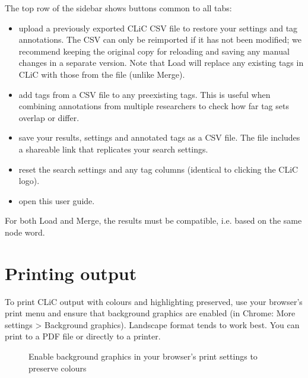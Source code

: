 \documentclass[letterpaper,10pt,english]{sphinxmanual}
\begin{document}
\sphinxAtStartPar
The top row of the sidebar shows buttons common to all tabs:
\begin{itemize}
\item {} 
\sphinxAtStartPar
{} \textendash{} upload a previously exported CLiC CSV file to restore
your settings and tag annotations. The CSV can only be reimported
if it has not been modified; we recommend keeping the original copy
for reloading and saving any manual changes in a separate version.
Note that Load will replace any existing tags in CLiC with those
from the file (unlike Merge).

\item {} 
\sphinxAtStartPar
{} \textendash{} add tags from a CSV file to any pre\sphinxhyphen{}existing tags. This
is useful when combining annotations from multiple researchers to
check how far tag sets overlap or differ.

\item {} 
\sphinxAtStartPar
{} \textendash{} save your results, settings and annotated tags as a CSV
file. The file includes a shareable link that replicates your search
settings.

\item {} 
\sphinxAtStartPar
{} \textendash{} reset the search settings and any tag columns (identical
to clicking the CLiC logo).

\item {} 
\sphinxAtStartPar
{} \textendash{} open this user guide.

\end{itemize}

\sphinxAtStartPar
For both Load and Merge, the results must be compatible, i.e. based on
the same node word.


\section{Printing output}
\label{\detokenize{introduction:printing-output}}
\sphinxAtStartPar
To print CLiC output with colours and highlighting preserved, use your
browser’s print menu and ensure that background graphics are enabled
(in Chrome: More settings \textgreater{} Background graphics). Landscape format
tends to work best. You can print to a PDF file or directly to a
printer.

\begin{figure}[htbp]
\centering
\capstart

\noindent{}
\caption{Enable background graphics in your browser’s print settings
to preserve colours}\label{\detokenize{introduction:id4}}\label{\detokenize{introduction:figure-printing-settings}}\end{figure}
\end{document}
